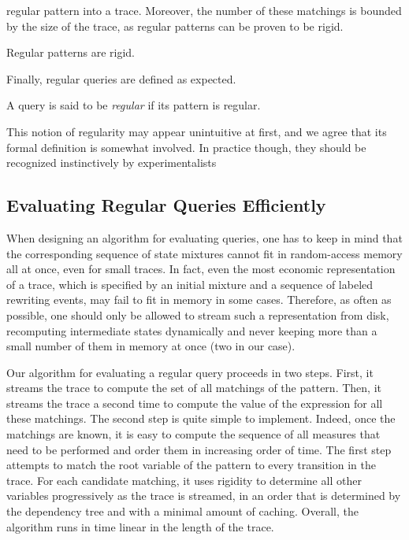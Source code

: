 \documentclass[runningheads]{llncs}
\begin{document}
regular pattern into a trace. Moreover, the number of
these matchings is bounded by the size of the trace, as regular
patterns can be proven to be rigid.
\begin{proposition}\label{prop:regular-rigid}
  Regular patterns are rigid.
\end{proposition}
Finally, regular queries are defined as expected.
\begin{definition}
  A query is said to be \emph{regular} if its pattern is regular.
\end{definition}
This notion of regularity may appear unintuitive at first, and we
agree that its formal definition is somewhat involved. In practice
though, they should be recognized instinctively by experimentalists


\subsection{Evaluating Regular Queries
  Efficiently}\label{subsec:evalq}

When designing an algorithm for evaluating queries, one has to keep in
mind that the corresponding sequence of state mixtures cannot fit in
random-access memory all at once, even for small traces. In fact, even
the most economic representation of a trace, which is specified by an
initial mixture and a sequence of labeled rewriting events, may fail
to fit in memory in some cases. Therefore, as often as possible, one
should only be allowed to stream such a representation from disk,
recomputing intermediate states dynamically and never keeping more
than a small number of them in memory at once (two in our case).

Our algorithm for evaluating a regular query proceeds in two
steps. First, it streams the trace to compute the set of all matchings
of the pattern. Then, it streams the trace a second time to compute
the value of the expression for all these matchings. The second step
is quite simple to implement. Indeed, once the matchings are known, it
is easy to compute the sequence of all measures that need to be
performed and order them in increasing order of time. The first step
attempts to match the root variable of the pattern to every transition
in the trace. For each candidate matching, it uses rigidity to
determine all other variables progressively as the trace is streamed,
in an order that is determined by the dependency tree and with a
minimal amount of caching. Overall, the algorithm runs in time linear
in the length of the trace.
\end{document}
